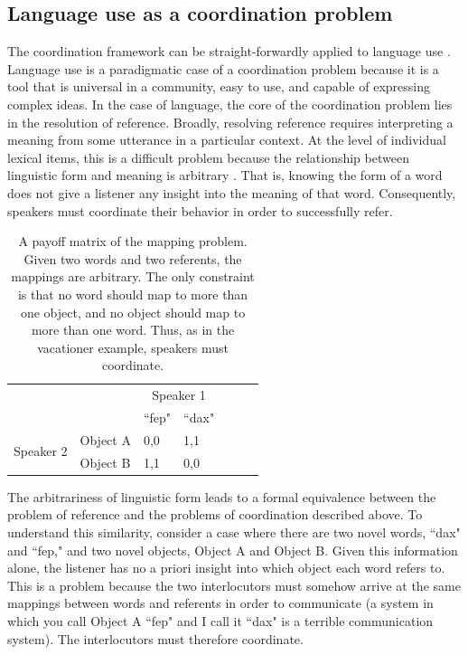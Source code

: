 \documentclass[man, noapacite, 12pt]{apa2}
\begin{document}
\subsection{Language use as a coordination problem}
The coordination  framework can be straight-forwardly applied to language use \cite{lewis1969convention}. Language use is a paradigmatic case of a coordination problem because it is a tool that is universal in a community, easy to use, and capable of expressing complex ideas. In the case of language, the core of the coordination problem lies in the resolution of reference. Broadly, resolving reference requires interpreting a meaning from some utterance in a particular context. At the level of individual lexical items, this is a difficult problem because the relationship between linguistic form and meaning is arbitrary \cite{saussure, hockett1960}. That is, knowing the form of a word does not give a listener any insight into the meaning of that word. Consequently, speakers must coordinate their behavior in order to successfully refer.

\begin{table}[t]
\begin{center}
\begin{tabular}{l p{3cm} l p{3cm} l p{3cm} l}
 &  & \multicolumn{2}{c}{Speaker 1} \\ \cline{2-4} 
\multicolumn{1}{l|}{} & \multicolumn{1}{l|}{} & \multicolumn{1}{l|}{``fep"} & \multicolumn{1}{l|}{``dax"} \\ \cline{2-4} 
\multicolumn{1}{c|}{\multirow{2}{*}{Speaker 2}} & \multicolumn{1}{l|}{Object A} & \multicolumn{1}{l|}{0,0} & \multicolumn{1}{l|}{1,1} \\ \cline{2-4} 
\multicolumn{1}{c|}{} & \multicolumn{1}{l|}{Object B} & \multicolumn{1}{l|}{1,1} & \multicolumn{1}{l|}{0,0} \\ \cline{2-4} 
\end{tabular}
\caption{A payoff matrix of the mapping problem. Given two words and two referents, the mappings are arbitrary. The only constraint is that no word should map to more than one object, and no object should map to more than one word. Thus, as in the vacationer example, speakers must coordinate.}
\end{center}
\end{table}

The arbitrariness of linguistic form leads to a formal equivalence between the problem of reference and the problems of coordination described above.  To understand this similarity, consider  a case where  there are two novel words, ``dax" and ``fep," and two novel objects, Object A and Object B. Given this information alone, the listener has no a priori insight into which object each word refers to. This is a problem because the two interlocutors must somehow arrive at the same mappings between words and referents in order to communicate (a system in which you call Object A ``fep" and I call it ``dax" is a terrible communication system). The interlocutors must therefore coordinate. 
\end{document}
